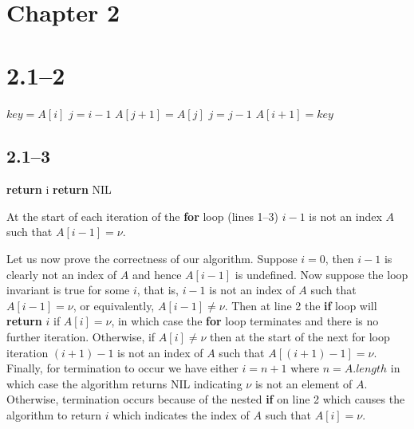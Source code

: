 \section{Chapter 2}
\label{sec:chp2}

\section*{2.1--2}

\begin{algorithmic}[1]
	\State $key = A[i]$
	\State $j = i - 1$
	\State $A[j+1] = A[j]$
	\State $j = j - 1$
	\EndWhile
	\State $A[i+1]=key$
\end{algorithmic}

\subsection*{2.1--3}

\begin{algorithmic}[1]
	\State \textbf{return} i
	\State \textbf{return} NIL
\end{algorithmic}

At the start of each iteration of the \textbf{for} loop (lines 1--3) $i-1$ is not an index $A$ such that $A[i-1]=\nu$.

Let us now prove the correctness of our algorithm. Suppose $i=0$, then $i-1$ is clearly not an index of $A$ and hence $A[i-1]$ is undefined. Now suppose the loop invariant is true for some $i$, that is, $i-1$ is not an index of $A$ such that $A[i-1]=\nu$, or equivalently, $A[i-1]\neq\nu$. Then at line 2 the \textbf{if} loop will \textbf{return} $i$ if $A[i]=\nu$, in which case the \textbf{for} loop terminates and there is no further iteration. Otherwise, if $A[i]\neq\nu$ then at the start of the next for loop iteration $(i+1)-1$ is not an index of $A$ such that $A[(i+1)-1]=\nu$. Finally, for termination to occur we have either $i=n+1$ where $n=A.length$ in which case the algorithm returns NIL indicating $\nu$ is not an element of $A$. Otherwise, termination occurs because of the nested \textbf{if} on line 2 which causes the algorithm to return $i$ which indicates the index of $A$ such that $A[i]=\nu$.
